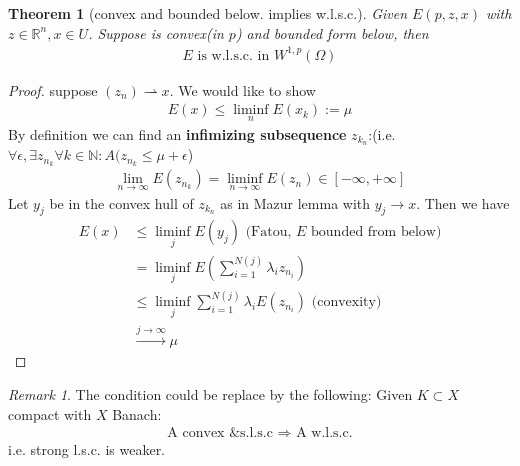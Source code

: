 \documentclass[a4paper,12pt,oneside,fleqn]{book}
\newtheorem{theorem}{Theorem}[section]
\theoremstyle{definition}
\theoremstyle{remark}
\newtheorem*{remark}{Remark}
\begin{document}
\begin{theorem}[convex and bounded below. implies w.l.s.c.]
	Given $E(p, z, x)$ with $z \in \mathbb{R}^n, x \in U$. Suppose is convex(in $p$) and bounded form below, then
	\begin{align*}
		\text{$E$ is  w.l.s.c. in $W^{1, p}(\Omega)$}
	\end{align*}  
\end{theorem}
\begin{proof}
	suppose $(z_n) \rightharpoonup x$. We would like to show
	\begin{align*}
		E(x) \le \liminf_{n} E(x_k):= \mu
	\end{align*} 
	By definition we can find an \textbf{infimizing subsequence} $z_{k_n}$:(i.e. $\forall \epsilon, \exists z_{n_k} \forall k \in \mathbb{N}: A(z_{n_k} \le \mu + \epsilon$)
	\begin{align*}
		\lim_{n \rightarrow \infty} E(z_{n_k}) = \liminf_{n \rightarrow \infty} E(z_n) \in [- \infty, + \infty]
	\end{align*} 
	Let $y_j$ be in the convex hull of $z_{k_n}$ as in Mazur lemma with $y_j \rightarrow x$. Then we have
	\begin{align*}
		E(x) &\le \liminf_j E(y_j)\text{ (Fatou, $E$ bounded from below)}\\
			 &= \liminf_j E(\sum_{i = 1}^{N(j)} \lambda_i z_{n_i}) \\
			 &\le \liminf_j \sum_{i = 1}^{N(j)} \lambda_i E(z_{n_i}) \text{ (convexity)}\\
			 &\overset{j\rightarrow \infty}{\rightarrow} \mu
	\end{align*}
\end{proof}
\begin{remark}
	The condition could be replace by the following: Given $K \subset X$ compact with $X$ Banach:
	\begin{align*}
		\text{A convex \& s.l.s.c $\Rightarrow$ A w.l.s.c.}
	\end{align*}	
	i.e. strong l.s.c. is weaker. 
\end{remark}
\end{document}
